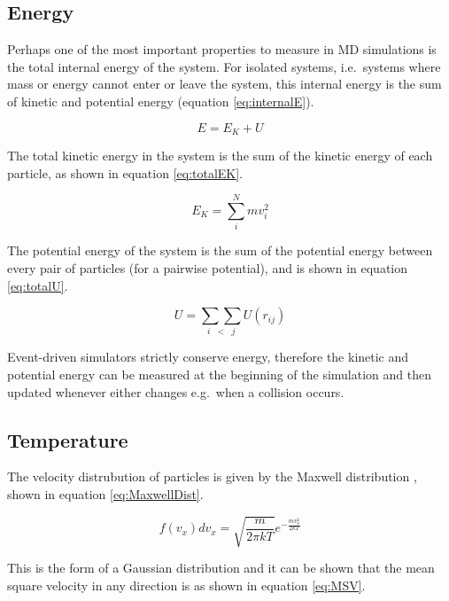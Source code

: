 \message{ !name(main.tex)}\documentclass[12pt]{UoAthesis}
\begin{document}
\subsection{Energy}
Perhaps one of the most important properties to measure in MD
simulations is the total internal energy of the system.  For isolated
systems, i.e.\ systems where mass or energy cannot enter or leave the
system, this internal energy is the sum of kinetic and potential
energy (equation \eqref{eq:internalE}).

\begin{equation}
  E = E_K + U \label{eq:internalE}
\end{equation}

The total kinetic energy in the system is the sum of the kinetic
energy of each particle, as shown in equation \eqref{eq:totalEK}.

\begin{equation}
  \label{eq:totalEK}
  E_K = \sum_i^N mv_i^2
\end{equation}

The potential energy of the system is the sum of the potential energy
between every pair of particles (for a pairwise potential), and is
shown in equation \eqref{eq:totalU}.

\begin{equation}
  \label{eq:totalU}
  U = \underset{i\;\;<\;\;j}{\sum\sum}U(r_{ij})
\end{equation}

Event-driven simulators strictly conserve energy, therefore the
kinetic and potential energy can be measured at the beginning of the
simulation and then updated whenever either changes e.g.\ when a
collision occurs.

\subsection{Temperature}

The velocity distrubution of particles is given by the Maxwell
distribution \cite{Haile1997}, shown in equation
\eqref{eq:MaxwellDist}.

\begin{equation}
  \label{eq:MaxwellDist}
  f(v_x)dv_x = \sqrt{\frac{m}{2\pi kT}}e^{-\frac{mv_x^2}{2kT}} 
\end{equation}

This is the form of a Gaussian distribution and it can be shown
\cite{Landau1968} that the mean square velocity in any direction is as
shown in equation \eqref{eq:MSV}.
\end{document}
